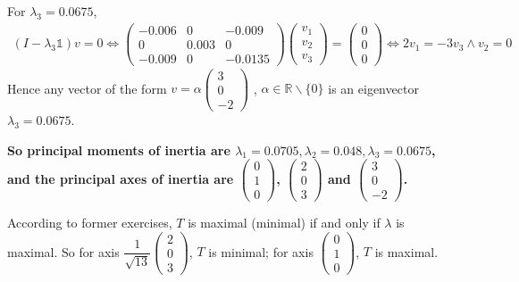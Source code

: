 \documentclass[a4paper,12pt,titlepage]{article}
\begin{document}
For $\lambda_3=0.0675$,
\begin{align*}
(I-\lambda_3\mathds{1})v=0\Leftrightarrow\begin{pmatrix}
-0.006&0&-0.009\\0&0.003&0\\-0.009&0&-0.0135\end{pmatrix}\begin{pmatrix}
v_1\\v_2\\v_3\end{pmatrix}=\begin{pmatrix}
0\\0\\0\end{pmatrix}\Leftrightarrow 2v_1=-3v_3\wedge v_2=0
\end{align*}
Hence any vector of the form $v = \alpha\begin{pmatrix}
3\\0\\-2\end{pmatrix}$
, $\alpha \in \mathbb{R} \backslash \lbrace0\rbrace$ is an eigenvector $\lambda_3 = 0.0675$.

\textbf{So principal moments of inertia are $\lambda_1=0.0705,\lambda_2=0.048,\lambda_3=0.0675$, and the principal axes of inertia are $\begin{pmatrix}
0\\1\\0\end{pmatrix}$,  $\begin{pmatrix}
2\\0\\3\end{pmatrix}$ and $\begin{pmatrix}
3\\0\\-2\end{pmatrix}$.}

According to former exercises, $T$ is maximal (minimal) if and only if $\lambda$ is maximal. So for axis $\dfrac{1}{\sqrt{13}}\begin{pmatrix}
2\\0\\3\end{pmatrix}$, $T$ is minimal; for axis $\begin{pmatrix}
0\\1\\0\end{pmatrix}$, $T$ is maximal.
\end{document}
